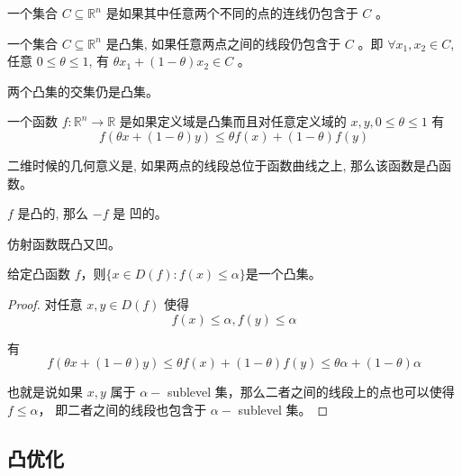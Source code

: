 \begin{definition}[仿射集]
    一个集合 $ C \subseteq \mathbb{R}^{n} $ 是如果其中任意两个不同的点的连线仍包含于 $ C $ 。
\end{definition}

\begin{definition}[凸集]
    一个集合 $ C \subseteq \mathbb{R}^{n} $ 是凸集, 如果任意两点之间的线段仍包含于 $ C $ 。即 $ \forall x_{1}, x_{2} \in C $, 任意 $ 0 \leqslant \theta \leqslant 1 $, 有 $ \theta x_{1}+(1-\theta) x_{2} \in C $ 。
\end{definition}

\begin{theorem}
    两个凸集的交集仍是凸集。
\end{theorem}

\begin{definition}[凸函数]
    一个函数 $ f: \mathbb{R}^{n} \rightarrow \mathbb{R} $ 是如果定义域是凸集而且对任意定义域的 $ x, y, 0 \leqslant \theta \leqslant 1 $ 有
$$
f(\theta x+(1-\theta) y) \leqslant \theta f(x)+(1-\theta) f(y)
$$
\end{definition}

二维时候的几何意义是, 如果两点的线段总位于函数曲线之上, 那么该函数是凸函数。

\begin{theorem}
    $ f $ 是凸的, 那么 $ -f $ 是 凹的。
\end{theorem}

\begin{theorem}
    
仿射函数既凸又凹。
\end{theorem}


\begin{theorem}
    给定凸函数 $ f$，则$\{x \in D(f): f(x) \leqslant \alpha\} $是一个凸集。
\end{theorem}

\begin{proof}
    对任意 $ x, y \in D(f) $ 使得 $$ f(x) \leqslant \alpha, f(y) \leqslant \alpha $$
    
    有 $$ f(\theta x+(1-\theta) y) \leqslant \theta f(x)+(1-\theta) f(y) \leqslant \theta \alpha+(1-\theta) \alpha $$
    
    也就是说如果 $ x, y $ 属于 $ \alpha- $ sublevel 集，那么二者之间的线段上的点也可以使得 $ f \leqslant \alpha ， $ 即二者之间的线段也包含于 $ \alpha- $ sublevel 集。
\end{proof}

\subsection{凸优化}

